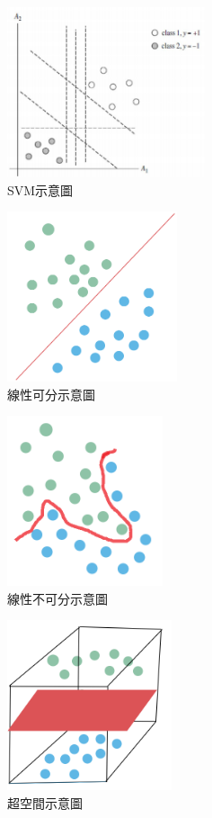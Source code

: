 \begin{figure}[H]
	\centerline{\includegraphics[height=5cm]{pic/SVML.png}}
	\caption{SVM示意圖}
	\label{fig:SVM}
\end{figure}
\begin{figure}[H]
	\centerline{\includegraphics[height=5cm]{pic/linear.PNG}}
	\caption{線性可分示意圖}
	\label{fig:LinearSeparable}
\end{figure}
\begin{figure}[H]
	\centerline{\includegraphics[height=5cm]{pic/unlinear.PNG}}
	\caption{線性不可分示意圖}
	\label{fig:LinearUnseparable}
\end{figure}

\begin{figure}[H]
	\centerline{\includegraphics[height=5cm]{pic/over space.PNG}}
	\caption{超空間示意圖}
	\label{fig:Hyperspace}
\end{figure}
\label{sec:background}

